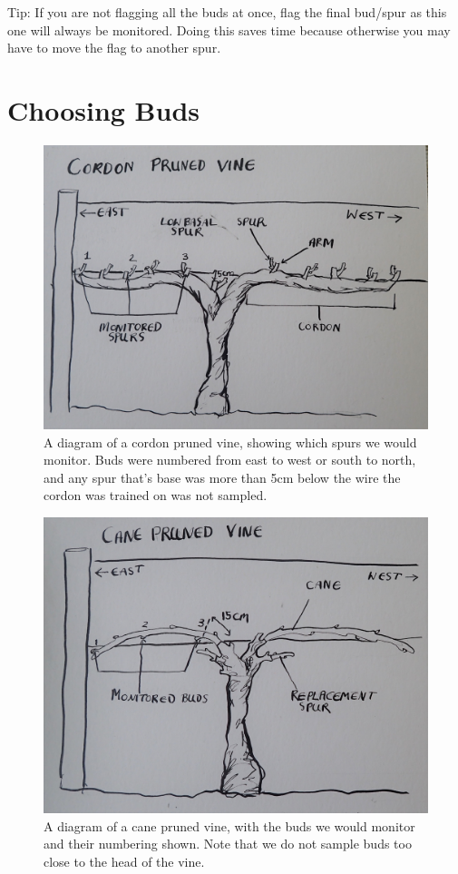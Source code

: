 \documentclass[11pt,letter]{article}
\begin{document}
Tip: If you are not flagging all the buds at once, flag the final bud/spur as this one will always be monitored. Doing this saves time because otherwise you may have to move the flag to another spur.

\section{Choosing Buds}

\begin{figure}%
  \includegraphics[width=\linewidth]{CordonPruned.jpg}
  \caption{A diagram of a cordon pruned vine, showing which spurs we would monitor. Buds were numbered from east to west or south to north, and any spur that's base was more than 5cm below the wire the cordon was trained on was not sampled.}
  \label{fig:CordonPruned}
\end{figure}

\begin{figure}%
  \includegraphics[width=\linewidth]{CanePruned.jpg}
  \caption{A diagram of a cane pruned vine, with the buds we would monitor and their numbering shown. Note that we do not sample buds too close to the head of the vine.}
  \label{fig:CanePruned}
\end{figure}
\end{document}
